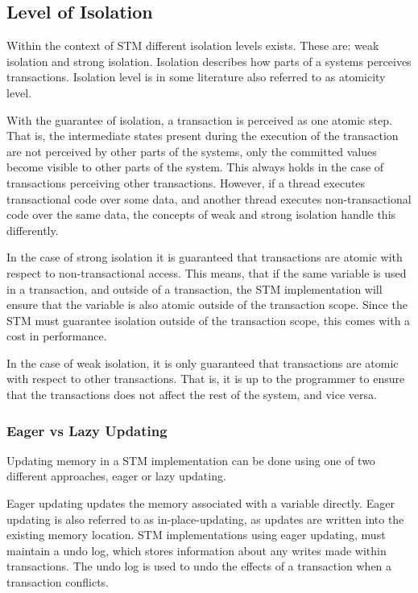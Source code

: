 \subsection{Level of Isolation}
\label{subsec:isolation_level}
Within the context of \ac{STM} different isolation levels exists. These are: weak isolation and strong isolation. Isolation describes how parts of a systems perceives transactions. Isolation level is in some literature also referred to as atomicity level\cite[p. 30]{harris2010transactional}.

With the guarantee of isolation, a transaction is perceived as one atomic step. That is, the intermediate states present during the execution of the transaction are not perceived by other parts of the systems, only the committed values become visible to other parts of the system. This always holds in the case of transactions perceiving other transactions. However, if a thread executes transactional code over some data, and another thread executes non-transactional code over the same data, the concepts of weak and strong isolation handle this differently.

In the case of strong isolation it is guaranteed that transactions are atomic with respect to non-transactional access\cite[p. 2083]{herlihy2011tm}. This means, that if the same variable is used in a transaction, and outside of a transaction, the \ac{STM} implementation will ensure that the variable is also atomic outside of the transaction scope. Since the \ac{STM} must guarantee isolation outside of the transaction scope, this comes with a cost in performance\cite{herlihy2011tm}. 

In the case of weak isolation, it is only guaranteed that transactions are atomic with respect to other transactions. That is, it is up to the programmer to ensure that the transactions does not affect the rest of the system, and vice versa. 

\subsubsection{Eager vs Lazy Updating}
Updating memory in a \ac{STM} implementation can be done using one of two different approaches, eager or lazy updating.

Eager updating updates the memory associated with a variable directly. Eager updating is also referred to as in-place-updating, as updates are written into the existing memory location\cite[p. 35]{afek2011lowering}. \ac{STM} implementations using eager updating, must maintain a undo log, which stores information about any writes made within transactions. The undo log is used to undo the effects of a transaction when a transaction conflicts\cite[p. 2084]{herlihy2011tm}.

